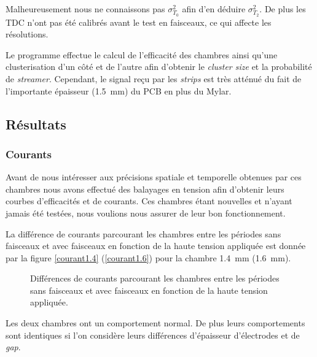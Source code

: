 Malheureusement nous ne connaissons pas $\sigma_{T_0}^2$ afin d'en déduire $\sigma_{T_2}^2$. De plus les TDC n'ont pas été calibrés avant le test en faisceaux, ce qui affecte les résolutions.

Le programme effectue le calcul de l'efficacité des chambres ainsi  qu'une clusterisation d'un côté et de l'autre afin d'obtenir le \textit{cluster size} et la probabilité de \textit{streamer}. Cependant, le signal reçu par les \textit{strips} est très atténué du fait de l'importante épaisseur (\SI{1.5}{\milli\meter}) du PCB en plus du Mylar.%

\subsection{Résultats}


\subsubsection{Courants}
Avant de nous intéresser aux précisions spatiale et temporelle obtenues par ces chambres nous avons effectué des balayages en tension afin d'obtenir leurs courbes d'efficacités et de courants. Ces chambres étant nouvelles et n'ayant jamais été testées, nous voulions nous assurer de leur bon fonctionnement.

La différence de courants parcourant les chambres entre les périodes sans faisceaux et avec faisceaux en fonction de la haute tension appliquée est donnée par la figure \ref{courant1.4} (\ref{courant1.6}) pour la chambre \SI{1.4}{\milli\meter} (\SI{1.6}{\milli\meter}).

\begin{figure}[ht!]
	\vspace{-0.5cm}
	\centering
	\caption{Différences de courants parcourant les chambres entre les périodes sans faisceaux et avec faisceaux en fonction de la haute tension appliquée.}
	\label{courant1.41.6}
\end{figure}

Les deux chambres ont un comportement normal. De plus leurs comportements sont identiques si l'on considère leurs différences d'épaisseur d'électrodes et de \textit{gap}.

